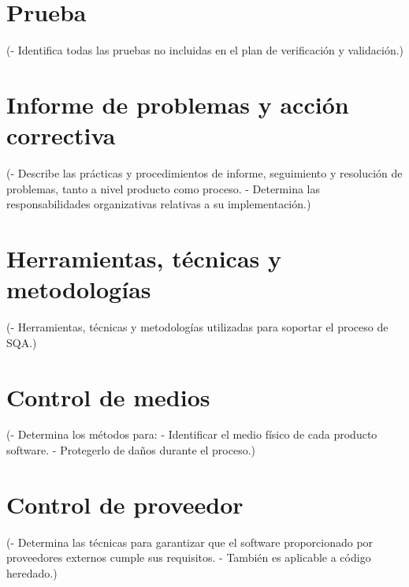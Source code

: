 \documentclass[spanish,a4paper,11pt, twoside]{report}	%
\begin{document}
\newpage
\mbox{}
\thispagestyle{empty}						%
\newpage

\chapter{ Prueba}
	(- Identifica todas las pruebas no incluidas en el plan
	de verificación y validación.)

\newpage
\mbox{}
\thispagestyle{empty}						%
\newpage

\chapter{ \hspace{0.25cm}Informe de problemas y acción correctiva}
	(- Describe las prácticas y procedimientos de informe,
	seguimiento y resolución de problemas, tanto a nivel	
	producto como proceso.
	- Determina las responsabilidades organizativas
	relativas a su implementación.)

\newpage
\mbox{}
\thispagestyle{empty}						%
\newpage

\chapter{ Herramientas, técnicas y metodologías}
	(- Herramientas, técnicas y metodologías utilizadas
	para soportar el proceso de SQA.)

\newpage
\mbox{}
\thispagestyle{empty}						%
\newpage

\chapter{ Control de medios}
	(- Determina los métodos para:
	- Identificar el medio físico de cada producto software.
	- Protegerlo de daños durante el proceso.)

\newpage
\mbox{}
\thispagestyle{empty}						%
\newpage

\chapter{ Control de proveedor}
	(- Determina las técnicas para garantizar que el
	software proporcionado por proveedores externos
	cumple sus requisitos.
	- También es aplicable a código heredado.)

\newpage
\mbox{}
\thispagestyle{empty}						%
\newpage
\end{document}

